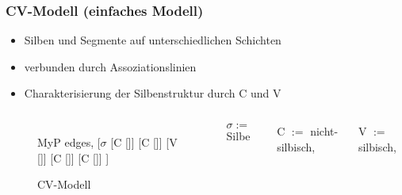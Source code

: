 \begin{frame}%
\frametitle{CV-Modell (einfaches Modell)}

\begin{itemize}
\item Silben und Segmente auf unterschiedlichen Schichten

\item verbunden durch Assoziationslinien

\item Charakterisierung der Silbenstruktur durch C und V 
\end{itemize}

\begin{columns}
	
\begin{figure}
	\centering
	\begin{forest}
		MyP edges,
		[$\sigma$
		[C []]
		[C []]
		[V []]
		[C []]
		[C []]
		]
	\end{forest}
	\caption{CV-Modell}
\end{figure}


$\sigma :=$ Silbe

C $:=$ nicht-silbisch, 

V $:=$ silbisch, 

\end{columns}

\end{frame}


